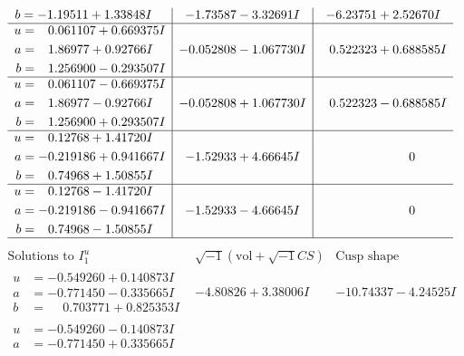 \documentclass[1p]{elsarticle_modified}
\theoremstyle{definition}
\newcommand{\I}{\sqrt{-1}}
\begin{document}
$$\begin{array}{c|c|c}
\begin{aligned}
b &= -1.19511 + 1.33848 I\end{aligned}
 & -1.73587 - 3.32691 I & -6.23751 + 2.52670 I \\ \hline\begin{aligned}
u &= \phantom{-}0.061107 + 0.669375 I \\
a &= \phantom{-}1.86977 + 0.92766 I \\
b &= \phantom{-}1.256900 - 0.293507 I\end{aligned}
 & -0.052808 - 1.067730 I & \phantom{-}0.522323 + 0.688585 I \\ \hline\begin{aligned}
u &= \phantom{-}0.061107 - 0.669375 I \\
a &= \phantom{-}1.86977 - 0.92766 I \\
b &= \phantom{-}1.256900 + 0.293507 I\end{aligned}
 & -0.052808 + 1.067730 I & \phantom{-}0.522323 - 0.688585 I \\ \hline\begin{aligned}
u &= \phantom{-}0.12768 + 1.41720 I \\
a &= -0.219186 + 0.941667 I \\
b &= \phantom{-}0.74968 + 1.50855 I\end{aligned}
 & -1.52933 + 4.66645 I & \phantom{-0.000000 } 0 \\ \hline\begin{aligned}
u &= \phantom{-}0.12768 - 1.41720 I \\
a &= -0.219186 - 0.941667 I \\
b &= \phantom{-}0.74968 - 1.50855 I\end{aligned}
 & -1.52933 - 4.66645 I & \phantom{-0.000000 } 0\\
 \hline 
 \end{array}$$\newpage$$\begin{array}{c|c|c}  
\text{Solutions to }I^u_{1}& \I (\text{vol} + \sqrt{-1}CS) & \text{Cusp shape}\\
 \hline 
\begin{aligned}
u &= -0.549260 + 0.140873 I \\
a &= -0.771450 - 0.335665 I \\
b &= \phantom{-}0.703771 + 0.825353 I\end{aligned}
 & -4.80826 + 3.38006 I & -10.74337 - 4.24525 I \\ \hline\begin{aligned}
u &= -0.549260 - 0.140873 I \\
a &= -0.771450 + 0.335665 I \\

\end{aligned}
\end{array}$$
\end{document}

